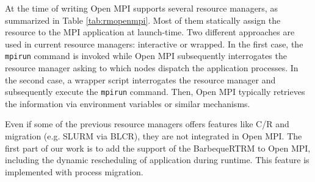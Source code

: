 At the time of writing Open MPI supports several resource managers, as
summarized in Table \ref{tab:rmopenmpi}. Most of them statically assign the
resource
to the MPI application at launch-time. Two different approaches are used in
current resource managers: interactive or wrapped. In the first case, the
\texttt{mpirun} command is invoked while Open MPI subsequently 
interrogates the resource manager asking to which nodes dispatch the application processes. 
In the second case, a wrapper script
interrogates the resource manager and subsequently execute the
\texttt{mpirun} command. Then, Open MPI typically retrieves the information
via environment variables or similar mechanisms.

Even if some of the previous resource managers offers features like C/R
and migration (e.g. SLURM via BLCR), they are not integrated in Open MPI.
The first part of our work is to add the support of the BarbequeRTRM to
Open MPI, including the dynamic rescheduling of application during runtime.
This feature is implemented with process migration.
\fi
